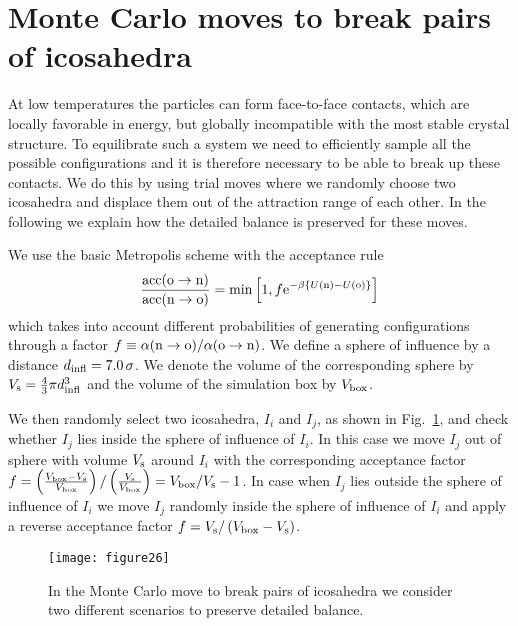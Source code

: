 \documentclass[10pt,aps,pre,twocolumn,superscriptaddress,amsmath,amssymb]{revtex4-1}
\begin{document}



\appendix

\section{Monte Carlo moves to break pairs of icosahedra}

At low temperatures the particles can form face-to-face contacts, which are locally favorable in energy, but globally incompatible with the most stable crystal structure. To equilibrate such a system we need to efficiently sample all the possible configurations and it is therefore necessary to be able to break up these contacts.
We do this by using trial moves where we randomly choose two icosahedra and displace them out of the attraction range of each other. In the following we explain how the detailed balance is preserved for these moves.

We use the basic Metropolis scheme with the acceptance rule~\cite{Frenkel2001}
\begin{equation}
 {{\rm acc}({\rm o}\to{\rm n})\over{\rm acc}({\rm n}\to{\rm o})}=\min\left[1,f{\rm e}^{-\beta\left\{U({\rm n})-U({\rm o})\right\}}\right]
\end{equation}
which takes into account different probabilities of generating configurations through a factor $f\equiv\alpha({\rm n}\to {\rm o})/\alpha({\rm o}\to {\rm n})$.
We define a sphere of influence by a distance $d_{\rm infl}=7.0\,\sigma$. We denote the volume of the corresponding sphere by $V_{\rm s}={4\over3}\pi d_{\rm infl}^3$ and the volume of the simulation box by $V_{\rm box}$.

We then randomly select two icosahedra, $I_i$ and $I_j$, as shown in Fig.~\ref{fig:move}, and check whether $I_j$ lies inside the sphere of influence of $I_i$. In this case we move $I_j$ out of sphere with volume $V_{\rm s}$ around $I_i$ with the corresponding acceptance factor $f=\left({V_{\rm box}-V_{\rm s}\over V_{\rm box}}\right)/\left({V_{\rm s}\over V_{\rm box}}\right)=V_{\rm box}/ V_{\rm s}-1$. In case when $I_j$ lies outside the sphere of influence of $I_i$ we move $I_j$ randomly inside the sphere of influence of $I_i$ and apply a reverse acceptance factor $f=V_{\rm s}/\left(V_{\rm box}-V_{\rm s}\right)$.

\begin{figure}
  \centering
  \texttt{[image: figure26]}
  \caption{In the Monte Carlo move to break pairs of icosahedra we consider two different scenarios to preserve detailed balance.}
  \label{fig:move}
\end{figure}
\end{document}
